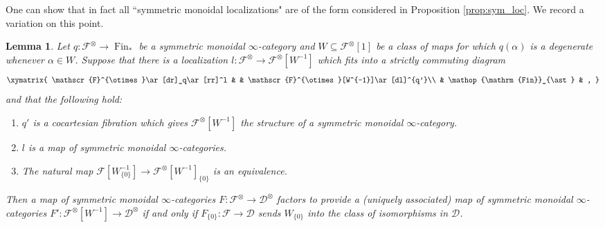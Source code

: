 \documentclass[reqno]{amsart}
\newtheorem{lemma}{Lemma}[section]
\theoremstyle{definition}
\newcommand{\msc}[1]{\mathscr{#1}}
\newcommand{\ot}{\otimes}
\DeclareMathOperator{\Fin}{Fin}
\renewcommand{\1}{\mathbf{1}}
\begin{document}
One can show that in fact all ``symmetric monoidal localizations" are of the form considered in Proposition \ref{prop:sym_loc}.  We record a variation on this point.

\begin{lemma}\label{lem:adv_loc}
Let $q:\msc{F}^{\ot}\to \Fin_{\ast}$ be a symmetric monoidal $\infty$-category and $W\subseteq \msc{F}^{\ot}[1]$ be a class of maps for which $q(\alpha)$ is a degenerate whenever $\alpha\in W$.  Suppose that there is a localization $l:\msc{F}^{\ot}\to \msc{F}^{\ot}[W^{-1}]$ which fits into a strictly commuting diagram
\[
\xymatrix{
\msc{F}^{\ot}\ar[dr]_q\ar[rr]^l & & \msc{F}^{\ot}[W^{-1}]\ar[dl]^{q'}\\
	& \Fin_{\ast} & ,
}
\]
and that the following hold:
\begin{enumerate}
\item[(a)] $q'$ is a cocartesian fibration which gives $\msc{F}^{\ot}[W^{-1}]$ the structure of a symmetric monoidal $\infty$-category.\vspace{1mm}
\item[(b)] $l$ is a map of symmetric monoidal $\infty$-categories.\vspace{1mm}
\item[(c)] The natural map $\msc{F}[W_{\{0\}}^{-1}]\to \msc{F}^{\ot}[W^{-1}]_{\{0\}}$ is an equivalence.
\end{enumerate}
Then a map of symmetric monoidal $\infty$-categories $F:\msc{F}^{\ot}\to \msc{D}^{\ot}$ factors to provide a (uniquely associated) map of symmetric monoidal $\infty$-categories $F':\msc{F}^{\ot}[W^{-1}]\to \msc{D}^{\ot}$ if and only if $F_{\{0\}}:\msc{F}\to \msc{D}$ sends $W_{\{0\}}$ into the class of isomorphisms in $\msc{D}$.
\end{lemma}
\end{document}
